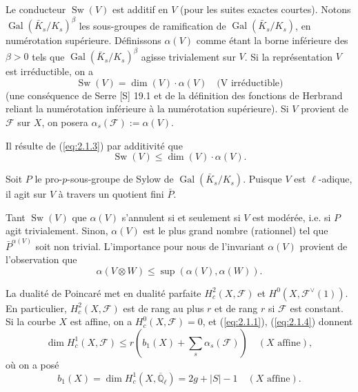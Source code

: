\documentclass[10pt,a4paper]{article}
\theoremstyle{plain}
\theoremstyle{definition}
\DeclareMathOperator{\Gal}{Gal}
\DeclareMathOperator{\Sw}{Sw}
\begin{document}
Le conducteur $\Sw(V)$ est additif en $V$ (pour les suites exactes courtes). Notons $\Gal(\bar{K}_s/K_s)^\beta$ les sous-groupes de ramification de $\Gal(\bar{K}_s/K_s)$, en num\'erotation sup\'erieure. D\'efinissons $\alpha(V)$ comme \'etant la borne inf\'erieure des $\beta > 0$ tels que $\Gal(\bar{K}_s/K_s)^\beta$ agisse trivialement sur $V$. Si la repr\'esentation $V$ est irr\'eductible, on a
\begin{equation}\label{eq:2.1.3}
\Sw(V) = \dim(V) \cdot \alpha(V) \quad \text{(V irr\'eductible)}
\end{equation}
(une cons\'equence de Serre [S] 19.1 et de la d\'efinition des fonctions de Herbrand reliant la num\'erotation inf\'erieure \`a la num\'erotation sup\'erieure). Si $V$ provient de $\mathcal{F}$ sur $X$, on posera $\alpha_s(\mathcal{F}) := \alpha(V)$.

Il r\'esulte de (\ref{eq:2.1.3}) par additivit\'e que
\begin{equation}\label{eq:2.1.4}
\Sw(V) \leq \dim(V) \cdot \alpha(V).
\end{equation}

Soit $P$ le pro-$p$-sous-groupe de Sylow de $\Gal(\bar{K}_s/K_s)$. Puisque $V$ est $\ell$-adique, il agit sur $V$ \`a travers un quotient fini $\bar{P}$.

Tant $\Sw(V)$ que $\alpha(V)$ s'annulent si et seulement si $V$ est mod\'er\'ee, i.e. si $P$ agit trivialement. Sinon, $\alpha(V)$ est le plus grand nombre (rationnel) tel que $\bar{P}^{\alpha(V)}$ soit non trivial. L'importance pour nous de l'invariant $\alpha(V)$ provient de l'observation que
\begin{equation}\label{eq:2.1.5}
\alpha(V \otimes W) \leq \sup(\alpha(V), \alpha(W)).
\end{equation}

La dualit\'e de Poincar\'e met en dualit\'e parfaite $H_c^2(X, \mathcal{F})$ et $H^0(X, \mathcal{F}^\vee(1))$. En particulier, $H_c^2(X, \mathcal{F})$ est de rang au plus $r$ et de rang $r$ si $\mathcal{F}$ est constant. Si la courbe $X$ est affine, on a $H_c^0(X, \mathcal{F}) = 0$, et (\ref{eq:2.1.1}), (\ref{eq:2.1.4}) donnent
\begin{equation}\label{eq:2.1.6}
\dim H_c^1(X, \mathcal{F}) \leq r(b_1(X) + \sum_s \alpha_s(\mathcal{F})) \quad (X \text{ affine}),
\end{equation}
o\`u on a pos\'e
\begin{equation}\label{eq:2.1.7}
b_1(X) = \dim H_c^1(X, \overline{\mathbb{Q}}_\ell) = 2g + |S| - 1 \quad (X \text{ affine}).
\end{equation}
\end{document}
